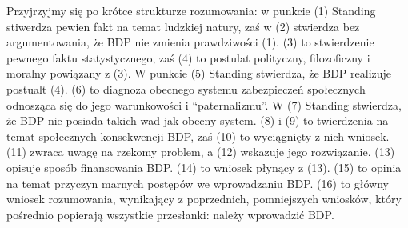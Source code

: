 \documentclass[11pt]{article}
\begin{document}
	\par Przyjrzyjmy się po krótce strukturze rozumowania: w punkcie (1) Standing stiwerdza pewien fakt na temat ludzkiej natury, zaś w (2) stwierdza bez argumentowania, że BDP nie zmienia prawdziwości (1). (3) to stwierdzenie pewnego faktu statystycznego, zaś (4) to postulat polityczny, filozoficzny i moralny powiązany z (3). W punkcie (5) Standing stwierdza, że BDP realizuje postualt (4). (6) to diagnoza obecnego systemu zabezpieczeń społecznych odnosząca się do jego warunkowości i ``paternalizmu''. W (7) Standing stwierdza, że BDP nie posiada takich wad jak obecny system. (8) i (9) to twierdzenia na temat społecznych konsekwencji BDP, zaś (10) to wyciągnięty z nich wniosek. (11) zwraca uwagę na rzekomy problem, a (12) wskazuje jego rozwiązanie. (13) opisuje sposób finansowania BDP. (14) to wniosek płynący z (13). (15) to opinia na temat przyczyn marnych postępów we wprowadzaniu BDP. (16) to główny wniosek rozumowania, wynikający z poprzednich, pomniejszych wniosków, który pośrednio popierają wszystkie przesłanki: należy wprowadzić BDP.
	
\end{document}
